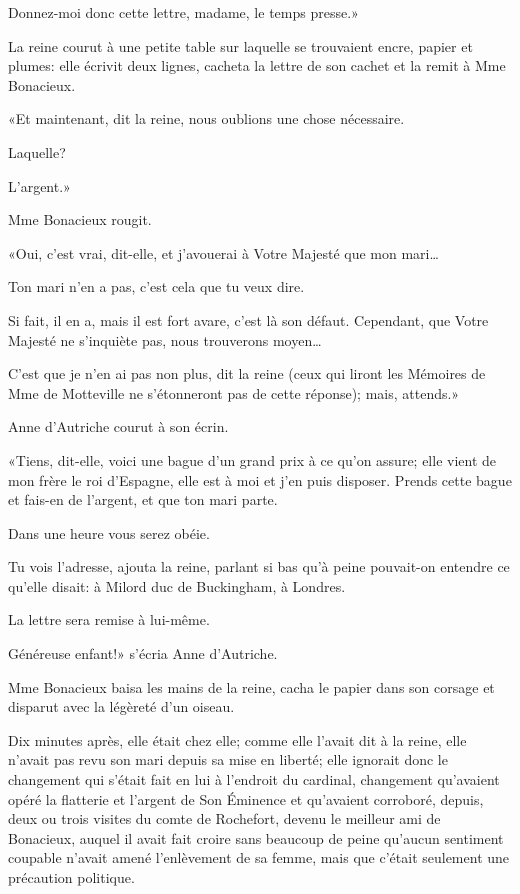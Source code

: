 \speak  Donnez-moi donc cette lettre, madame, le temps presse.» 

La reine courut à une petite table sur laquelle se trouvaient encre, papier et plumes: elle écrivit deux lignes, cacheta la lettre de son cachet et la remit à Mme Bonacieux. 

«Et maintenant, dit la reine, nous oublions une chose nécessaire. 

\speak  Laquelle? 

\speak  L'argent.» 

Mme Bonacieux rougit. 

«Oui, c'est vrai, dit-elle, et j'avouerai à Votre Majesté que mon mari\dots 

\speak  Ton mari n'en a pas, c'est cela que tu veux dire. 

\speak  Si fait, il en a, mais il est fort avare, c'est là son défaut. Cependant, que Votre Majesté ne s'inquiète pas, nous trouverons moyen\dots 

\speak  C'est que je n'en ai pas non plus, dit la reine (ceux qui liront les Mémoires de Mme de Motteville ne s'étonneront pas de cette réponse); mais, attends.» 

Anne d'Autriche courut à son écrin. 

«Tiens, dit-elle, voici une bague d'un grand prix à ce qu'on assure; elle vient de mon frère le roi d'Espagne, elle est à moi et j'en puis disposer. Prends cette bague et fais-en de l'argent, et que ton mari parte. 

\speak  Dans une heure vous serez obéie. 

\speak  Tu vois l'adresse, ajouta la reine, parlant si bas qu'à peine pouvait-on entendre ce qu'elle disait: à Milord duc de Buckingham, à Londres. 

\speak  La lettre sera remise à lui-même. 

\speak  Généreuse enfant!» s'écria Anne d'Autriche. 

Mme Bonacieux baisa les mains de la reine, cacha le papier dans son corsage et disparut avec la légèreté d'un oiseau. 

Dix minutes après, elle était chez elle; comme elle l'avait dit à la reine, elle n'avait pas revu son mari depuis sa mise en liberté; elle ignorait donc le changement qui s'était fait en lui à l'endroit du cardinal, changement qu'avaient opéré la flatterie et l'argent de Son Éminence et qu'avaient corroboré, depuis, deux ou trois visites du comte de Rochefort, devenu le meilleur ami de Bonacieux, auquel il avait fait croire sans beaucoup de peine qu'aucun sentiment coupable n'avait amené l'enlèvement de sa femme, mais que c'était seulement une précaution politique. 

